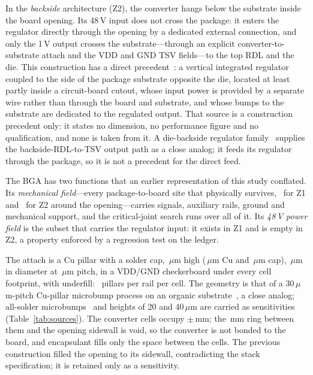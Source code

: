 \documentclass[journal]{IEEEtran}
\begin{document}
In the \emph{backside} architecture (Z2), the converter hangs below the substrate inside the
board opening. Its 48\,V input does not cross the package: it enters the regulator directly
through the opening by a dedicated external connection, and only the 1\,V output crosses the
substrate---through an explicit converter-to-substrate attach and the VDD and GND TSV fields---to
the top RDL and the die. This construction has a direct precedent~\cite{ArmCutoutVR2026}: a
vertical integrated regulator coupled to the side of the package substrate opposite the die,
located at least partly inside a circuit-board cutout, whose input power is provided by a
separate wire rather than through the board and substrate, and whose bumps to the substrate are
dedicated to the regulated output. That source is a construction precedent only: it states no
dimension, no performance figure and no qualification, and none is taken from it. A
die-backside regulator family~\cite{GoogleBacksideIVR2021} supplies the backside-RDL-to-TSV
output path as a close analog; it feeds its regulator through the package, so it is not a
precedent for the direct feed.

The BGA has two functions that an earlier representation of this study conflated. Its
\emph{mechanical field}---every package-to-board site that physically survives, \NsitesZone\
for Z1 and \NsitesZtwo\ for Z2 around the opening---carries signals, auxiliary rails, ground and
mechanical support, and the critical-joint search runs over all of it. Its \emph{48\,V power
field} is the subset that carries the regulator input: it exists in Z1 and is empty in Z2, a
property enforced by a regression test on the ledger.

The attach is a Cu pillar with a solder cap, \AttachH\,$\mu$m high (\AttachCu\,$\mu$m Cu and
\AttachCap\,$\mu$m cap), \AttachD\,$\mu$m in diameter at \AttachPitch\,$\mu$m pitch, in a VDD/GND
checkerboard under every cell footprint, with underfill: \AttachNbump\ pillars per rail per cell.
The geometry is that of a 30\,$\mu$m-pitch Cu-pillar microbump process on an organic
substrate~\cite{Au2016CuPillar30um}, a close analog; all-solder microbumps~\cite{Na2022SnMicrobump}
and heights of 20 and 40\,$\mu$m are carried as sensitivities (Table~\ref{tab:sources}). The
converter cells occupy $\pm$\FillExtentMM\,mm; the \ClearanceMM\,mm ring between them and the
opening sidewall is void, so the converter is not bonded to the board, and encapsulant fills only
the space between the cells. The previous construction filled the opening to its sidewall,
contradicting the stack specification; it is retained only as a sensitivity.
\end{document}
